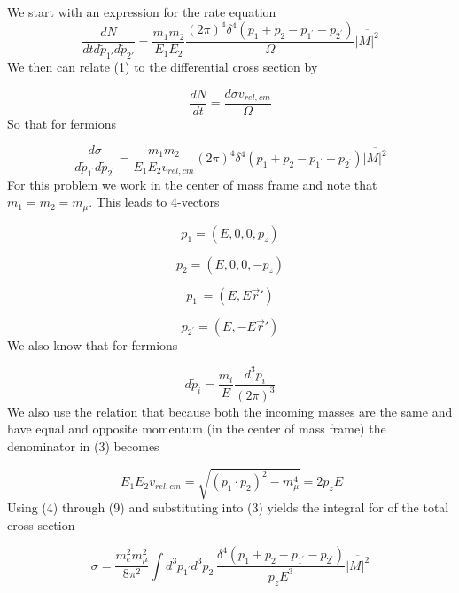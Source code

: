 \documentclass{article}
\begin{document}
We start with an expression for the rate equation
\begin{equation}
\frac{dN}{dtd\widetilde{p}_{1'}d\widetilde{p}_{2'}}=\frac{m_1m_2}{E_1E_2}\frac{(2\pi)^4\delta^4(p_1+p_2-p_{1^{'}}-p_{2^{'}})}{\Omega}\overline{\left|M\right|^2}
\end{equation}
We then can relate (1) to the differential cross section by

\begin{equation}
\frac{dN}{dt}=\frac{d\sigma v_{rel,cm}}{\Omega}
\end{equation}
So that for fermions

\begin{equation}
\frac{d\sigma}{d\widetilde{p}_{1^{'}}d\widetilde{p}_{2^{'}}}=\frac{m_1m_2}{E_1E_2v_{rel,cm}}(2\pi)^4\delta^4(p_1+p_2-p_{1^{'}}-p_{2^{'}})\overline{\left|M\right|^2}
\end{equation}
For this problem we work in the center of mass frame and note that $m_1=m_2=m_\mu$.  This leads to 4-vectors

\begin{equation}
p_1=\left(E,0,0,p_z\right)
\end{equation}

\begin{equation}
p_2=\left(E,0,0,-p_z\right)
\end{equation}

\begin{equation}
p_{1^{'}}=\left(E,E\vec{r}'\right)
\end{equation}

\begin{equation}
p_{2^{'}}=\left(E,-E\vec{r}'\right)
\end{equation}
We also know that for fermions

\begin{equation}
d\widetilde{p}_i=\frac{m_i}{E}\frac{d^3p_i}{\left(2\pi\right)^3}
\end{equation}
We also use the relation that because both the incoming masses are the same and have equal and opposite momentum (in the center of mass frame) the denominator in (3) becomes

\begin{equation}\
E_1E_2v_{rel,cm}=\sqrt{(p_1\cdot p_2)^2-m_\mu^4}=2p_zE
\end{equation}
Using (4) through (9) and substituting into (3) yields the integral for of the total cross section

\begin{equation}
\sigma=\frac{m_e^2m_\mu^2}{8\pi^2}\int d^3p_{1^{'}}d^3p_{2^{'}}\frac{\delta^4\left(p_1+p_2-p_{1^{'}}-p_{2^{'}}\right)}{p_zE^3}\overline{\left|M\right|^2}
\end{equation}
\end{document}
